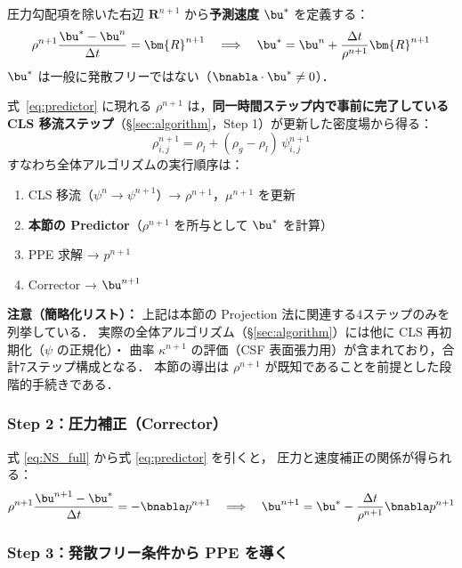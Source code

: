 圧力勾配項を除いた右辺 $\bm{R}^{n+1}$ から\textbf{予測速度} $\bu^*$ を定義する：
\begin{equation}
  \rho^{n+1}\frac{\bu^* - \bu^n}{\Delta t} = \bm{R}^{n+1}
  \quad\Longrightarrow\quad
  \bu^* = \bu^n + \frac{\Delta t}{\rho^{n+1}}\bm{R}^{n+1}
  \label{eq:predictor}
\end{equation}
$\bu^*$ は一般に発散フリーではない（$\bnabla\cdot\bu^* \neq 0$）．

\begin{tcolorbox}[mybox, title={$\rho^{n+1}$ はどこから来るか：Operator Splitting の順序}]
式~\eqref{eq:predictor} に現れる $\rho^{n+1}$ は，\textbf{同一時間ステップ内で事前に完了している
CLS 移流ステップ}（§\ref{sec:algorithm}，Step 1）が更新した密度場から得る：
\[
  \rho^{n+1}_{i,j} = \rho_l + (\rho_g - \rho_l)\,\psi^{n+1}_{i,j}
\]
すなわち全体アルゴリズムの実行順序は：
\begin{enumerate}
  \item CLS 移流（$\psi^n \to \psi^{n+1}$）→ $\rho^{n+1}$，$\mu^{n+1}$ を更新
  \item \textbf{本節の Predictor}（$\rho^{n+1}$ を所与として $\bu^*$ を計算）
  \item PPE 求解 → $p^{n+1}$
  \item Corrector → $\bu^{n+1}$
\end{enumerate}
\textbf{注意（簡略化リスト）：} 上記は本節の Projection 法に関連する4ステップのみを列挙している．
実際の全体アルゴリズム（§\ref{sec:algorithm}）には他に CLS 再初期化（$\psi$ の正規化）・
曲率 $\kappa^{n+1}$ の評価（CSF 表面張力用）が含まれており，合計7ステップ構成となる．
本節の導出は $\rho^{n+1}$ が既知であることを前提とした段階的手続きである．
\end{tcolorbox}

\subsubsection{Step 2：圧力補正（Corrector）}

式 \eqref{eq:NS_full} から式 \eqref{eq:predictor} を引くと，
圧力と速度補正の関係が得られる：
\begin{equation}
  \rho^{n+1}\frac{\bu^{n+1} - \bu^*}{\Delta t} = -\bnabla p^{n+1}
  \quad\Longrightarrow\quad
  \bu^{n+1} = \bu^* - \frac{\Delta t}{\rho^{n+1}}\bnabla p^{n+1}
  \label{eq:corrector}
\end{equation}

\subsubsection{Step 3：発散フリー条件から PPE を導く}

